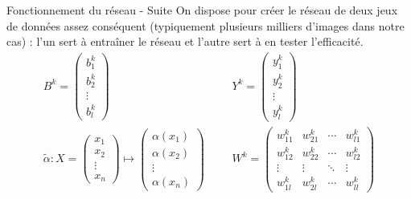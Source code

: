\documentclass[ignorenonframetext,]{beamer}
\begin{document}
\begin{frame}{Fonctionnement du réseau - Suite}
	On dispose pour créer le réseau de deux jeux de données assez conséquent (typiquement plusieurs milliers d'images dans notre cas) : l'un sert à entraîner le réseau et l'autre sert à en tester l'efficacité.
    \begin{align*}
        B^k = \begin{pmatrix} b_1^k \\ b_2^k \\ \vdots \\ b_l^k \end{pmatrix}
        &&&
        Y^k = \begin{pmatrix} y_1^k \\ y_2^k \\ \vdots \\ y_l^k \end{pmatrix}
        \\
        \tilde\alpha : X = \begin{pmatrix}
            x_1 \\
            x_2 \\
            \vdots \\
            x_n
        \end{pmatrix} \mapsto \begin{pmatrix}
            \alpha(x_1) \\
            \alpha(x_2) \\
            \vdots \\
            \alpha(x_n)
        \end{pmatrix} &&&
        W^k = \begin{pmatrix}
            w_{11}^k  & w_{21}^k & \cdots & w_{l1}^k \\
            w_{12}^k  & w_{22}^k & \cdots & w_{l2}^k \\
            \vdots & \vdots & \ddots & \vdots \\
            w_{1l}^k  & w_{2l}^k & \cdots & w_{ll}^k
        \end{pmatrix}
    \end{align*}
\end{frame}
\end{document}
